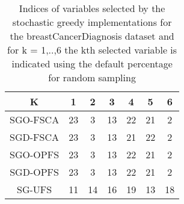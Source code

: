 \begin{table}
	\begin{center}
		\begin{tabular}{c c c c c c c}
			K & 1 & 2 & 3 & 4 & 5 & 6 \\
			\hline
			SGO-FSCA & 23 & 3 & 13 & 22 & 21 & 2 \\
			SGD-FSCA & 23 & 3 & 13 & 21 & 22 & 2 \\
			SGO-OPFS & 23 & 3 & 13 & 22 & 21 & 2 \\
			SGD-OPFS & 23 & 3 & 13 & 22 & 21 & 2 \\
			SG-UFS & 11 & 14 & 16 & 19 & 13 & 18 \\
		\end{tabular}
	\end{center}
	\caption{Indices of variables selected by the stochastic greedy implementations for the breastCancerDiagnosis dataset and for k = 1,..,6 the kth selected variable is indicated using the default percentage for random sampling}
\end{table}